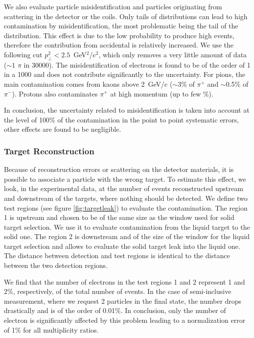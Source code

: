 We also evaluate particle misidentification and particles originating from 
scattering in the detector or the coils. Only tails of distributions can lead to high 
contamination by misidentification, the most problematic being the tail of the 
\pt distribution. This effect is due to the low probability to produce high 
\pt events, therefore the contribution from accidental is relatively 
increased. We use the following cut $p_\perp^2 < 2.5$~GeV$^2$/c$^2$, which 
only removes a very little amount of data ($\sim 1$ $\pi$ in 30000). The 
misidentification of electrons is found to be of the order of 1 in a 1000 and 
does not contribute significantly to the uncertainty. For pions, the main 
contamination comes from kaons above 2~GeV/c ($\sim$3\% of $\pi^+$ and 
$\sim$0.5\% of $\pi^-$). Protons also contaminates $\pi^+$ at 
high momentum (up to few \%). 

In conclusion, the uncertainty related to misidentification 
is taken into account at the level of 100\% of the contamination in the point 
to point systematic errors, other effects are found to be negligible.

\subsubsection{Target Reconstruction}

Because of reconstruction errors or scattering on the detector materials, it 
is possible to associate a particle with the wrong target. To estimate this 
effect, we look, in the experimental data, at the number of events 
reconstructed upstream and downstream of the targets, where nothing should be
detected. We define two test regions (see figure \ref{fig:targetleak}) to evaluate
the contamination. The region 1 is upstream and chosen to be of the same size as the window used for solid 
target selection. We use it to evaluate contamination from the liquid target to the solid one. The region 2
is downstream and of the size of the window for the liquid target selection 
and allows to evaluate the solid target leak into the liquid one.
The distance between detection and test regions is identical to the 
distance between the two detection regions. 

We find
that the number of electrons in the test regions 1 and 2 represent 1 and 2\%, 
respectively, of the total number of events. In the case of semi-inclusive measurement, where we request
2 particles in the final state, the number drops drastically and is of the order of
0.01\%. In conclusion, only the number of electron is significantly affected by this problem
leading to a normalization error of 1\% for all multiplicity ratios.

